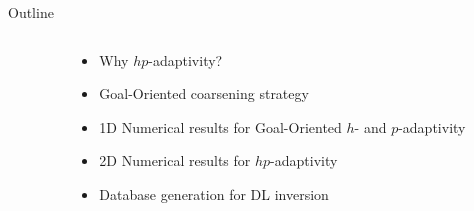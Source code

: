 {

\begin{frame}{Outline}
\begin{columns}
\begin{column}{0.05\textwidth}
\end{column}
\begin{column}{0.95\textwidth}

	\vspace{-0.2cm}
	\begin{itemize}\setlength{\itemindent}{1cm}
	\item Why \( hp \)-adaptivity?
	\item Goal-Oriented coarsening strategy      
	\item 1D Numerical results for Goal-Oriented $h$- and $p$-adaptivity
	\item 2D Numerical results for $hp$-adaptivity
	\end{itemize}

\vspace{0.4cm}

	\vspace{-0.2cm}
	\begin{itemize}\setlength{\itemindent}{1cm}
	\item Database generation for DL inversion
	\end{itemize}

\vspace{0.4cm}


\vspace{0.4cm}

\end{column}
\end{columns}

\end{frame} 
}